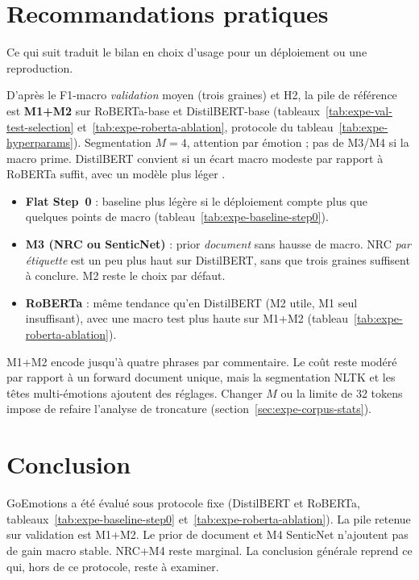 \section{Recommandations pratiques}
\label{sec:expe-recommandations}

Ce qui suit traduit le bilan en choix d'usage pour un déploiement ou
une reproduction.

D'après le F1-macro \emph{validation}
moyen (trois graines) et H2, la pile de référence est \textbf{M1+M2} sur
RoBERTa-base et DistilBERT-base
(tableaux~\ref{tab:expe-val-test-selection}
et~\ref{tab:expe-roberta-ablation}, protocole du
tableau~\ref{tab:expe-hyperparams}). Segmentation $M{=}4$, attention par
émotion ; pas de M3/M4 si la macro prime. DistilBERT convient si un
écart macro modeste par rapport à RoBERTa suffit, avec un modèle plus
léger \cite{sanh2019distilbert}.

\begin{itemize}
\item \textbf{Flat Step~0} : baseline plus légère si le déploiement
      compte plus que quelques points de macro
      (tableau~\ref{tab:expe-baseline-step0}).
\item \textbf{M3 (NRC ou SenticNet)} : prior \emph{document} sans
      hausse de macro. NRC \emph{par étiquette} est un peu plus haut
      sur DistilBERT, sans que trois graines suffisent à conclure. M2
      reste le choix par défaut.
\item \textbf{RoBERTa} : même tendance qu'en DistilBERT (M2 utile, M1
      seul insuffisant), avec une macro test plus haute sur M1+M2
      (tableau~\ref{tab:expe-roberta-ablation}).
\end{itemize}

M1+M2 encode jusqu'à quatre phrases par
commentaire. Le coût reste modéré par rapport à un forward document
unique, mais la segmentation NLTK et les têtes multi-émotions ajoutent
des réglages. Changer $M$ ou la limite de 32 tokens impose de refaire
l'analyse de troncature (section~\ref{sec:expe-corpus-stats}).

\section*{Conclusion}
GoEmotions a été évalué sous protocole fixe (DistilBERT et RoBERTa,
tableaux~\ref{tab:expe-baseline-step0} et~\ref{tab:expe-roberta-ablation}).
La pile retenue sur validation est M1+M2. Le prior de document et M4
SenticNet n'ajoutent pas de gain macro stable. NRC+M4 reste marginal.
La conclusion générale reprend ce qui, hors de ce protocole, reste à
examiner.
